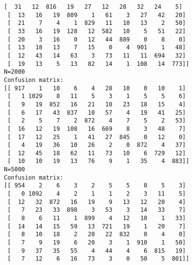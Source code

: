 \documentclass{article}
\begin{document}
\begin{Verbatim}[commandchars=\\\{\}]
 [  31   12  816   19   27   12   28   32   24    5]
 [  13   16   19  809    1   61    3   27   42   20]
 [  21    7    4    1  829   11   10   13    2   50]
 [  33   16   19  128   12  582   10    5   51   22]
 [  20    3   16    0   12   44  889    0    8    0]
 [  13   18   13    7   15    0    4  901    1   48]
 [  12   43   14   63    3   73   11   11  694   32]
 [  19   13    5   13   82   14    1  108   14  773]]
N=2000
Confusion matrix:
[[ 917    1   10    6    4   28   10    0   10    1]
 [   1 1029    8   11    5    3    1    5    5    6]
 [   9   19  852   16   21   10   23   18   15    4]
 [   6   17   43  837   10   57    4   19   41   25]
 [   2    5    7    2  872    4    7    5    2   53]
 [  16   12   19  108   16  669    8    3   48    7]
 [  17   12   25    1   41   27  845    0   12    0]
 [   4   19   36   10   26    2    0  872    4   37]
 [  12   45   18   62   11   73   10    6  729   12]
 [  10   10   19   13   76    9    1   35    4  883]]
N=5000
Confusion matrix:
[[ 954    2    6    3    2    5    5    0    5    3]
 [   0 1092    4    2    1    1    2    3   11    5]
 [  12   32  872   16   19    9   13   12   20    4]
 [   7   23   33  898    3   53    3   14   33    7]
 [   8    6   11    1  899    4   12   10    1   33]
 [  14   14   15   59   13  721   19    1   20    7]
 [   8   10   18    2   20   22  832    0    4    0]
 [   7    9   19    6   20    3    1  910    1   50]
 [   9   37   35   55    4   44    4    6  815   19]
 [   7   12    6   16   73    3    0   50    5  801]]
    \end{Verbatim}

    \begin{center}
    \end{center}
    { \hspace*{\fill} \\}
    
    \begin{center}
    \end{center}
    { \hspace*{\fill} \\}
    
    \begin{center}
    \end{center}
    { \hspace*{\fill} \\}
    
\end{document}
